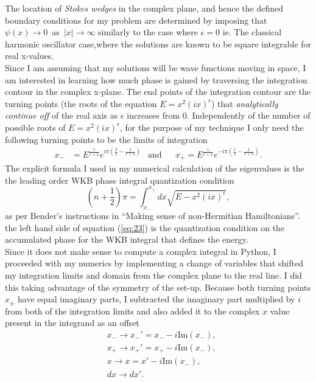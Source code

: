 \documentclass[10pt, a4paper, singlespacing, headsepline]{report}
\begin{document}
The location of \emph{Stokes wedges} in the complex plane, and hence the defined boundary conditions for my problem are determined by imposing that \mbox{$\psi(x) \rightarrow 0$ as $|x| \rightarrow \infty$} similarly to the case where $\epsilon = 0$ ie. The classical harmonic oscillator case,where the solutions are known to be square integrable for real x-values.\\
Since I am assuming that my solutions will be wave functions moving in space, I am interested in learning how much phase is gained by traversing the integration contour in the complex x-plane. The end points of the integration contour are the turning points (the roots of the equation $E = x^2(ix)^{\epsilon}$) that \emph{analytically continue off} of the real axis as $\epsilon$ increases from $0$\cite{BenderPT}\cite{Bender}. Independently of the number of possible roots of $E = x^2(ix)^{\epsilon}$, for the purpose of my technique I only need the following turning points to be the limits of integration
\begin{align} \label{eq:22}
x_{-}& = 
E^{\frac{1}{\epsilon + 2}}
e^{i\pi(\frac{3}{2} - \frac{1}{\epsilon + 2})}
&\mathrm{and}&
&x_{+} = E^{\frac{1}{\epsilon + 2}} e^{-i\pi(\frac{1}{2} - \frac{1}{\epsilon + 2})}.
\end{align}
The explicit formula I used in my numerical calculation of the eigenvalues is the the leading order WKB phase integral quantization condition 
\begin{equation} \label{eq:23}
\left (n +\frac{1}{2}\right )\pi = \int^{x_{+}}_{x_{-}}dx \sqrt{E - x^2(ix)^{\epsilon}},
\end{equation}
as per Bender's instructions in ``Making sense of non-Hermitian Hamiltonians''. the left hand side of equation (\ref{eq:23}) is the quantization condition on the accumulated phase for the WKB integral that defines the energy.\\
Since it does not make sense to compute a complex integral in Python, I proceeded with my numerics by implementing a change of variables that shifted my integration limits and domain from the complex plane to the real line. I did this taking advantage of the symmetry of the set-up. Because both turning points $x_{\pm}$ have equal imaginary parts, I subtracted the imaginary part multiplied by $i$ from both of the integration limits and also added it to the complex $x$ value present in the integrand as an offset
\begin{equation} \label{eq:24}
\begin{split}
&x_{-}\rightarrow x_{-}' = x_{-} - i \mathrm{Im}(x_{-}),\\
&x_{+}\rightarrow x_{+}' = x_{+} - i \mathrm{Im}(x_{-}),\\
&x\rightarrow x = x' - i \mathrm{Im}(x_{-}),\\
&dx\rightarrow dx'.
\end{split}
\end{equation}
\end{document}
